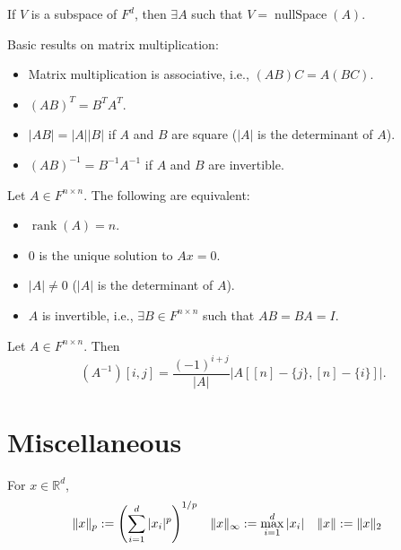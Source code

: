 \documentclass[a4paper,12pt,fleqn]{article}
\newenvironment*{tightemize}{\begin{itemize}[noitemsep]}{\end{itemize}}
\DeclareMathOperator{\rank}{rank}
\DeclareMathOperator{\nullSpace}{nullSpace}
\begin{document}
\begin{theorem}[DWAP]
If $V$ is a subspace of $F^d$, then $\exists A$ such that $V = \nullSpace(A)$.
\end{theorem}

\begin{theorem}[DWAP]
Basic results on matrix multiplication:
\begin{tightemize}
\item Matrix multiplication is associative, i.e., $(AB)C = A(BC)$.
\item $(AB)^T = B^TA^T$.
\item $|AB| = |A||B|$ if $A$ and $B$ are square ($|A|$ is the determinant of $A$).
\item $(AB)^{-1} = B^{-1}A^{-1}$ if $A$ and $B$ are invertible.
\end{tightemize}
\end{theorem}

\begin{theorem}
Let $A \in F^{n \times n}$. The following are equivalent:
\begin{tightemize}
\item $\rank(A) = n$.
\item 0 is the unique solution to $Ax = 0$.
\item $|A| \neq 0$ ($|A|$ is the determinant of $A$).
\item $A$ is invertible, i.e., $\exists B \in F^{n \times n}$ such that $AB = BA = I$.
\end{tightemize}
\end{theorem}

\begin{theorem}
Let $A \in F^{n \times n}$. Then
\[ (A^{-1})[i, j] = \frac{(-1)^{i+j}}{|A|}|A[[n]-\{j\}, [n]-\{i\}]|. \]
\end{theorem}

\section{Miscellaneous}

\begin{definition}[$p$-norms]
For $x \in \mathbb{R}^d$,
\begin{align*}
\|x\|_p &:= \left(\sum_{i=1}^d |x_i|^p\right)^{1/p}
& \|x\|_{\infty} &:= \max_{i=1}^d |x_i|
& \|x\| &:= \|x\|_2
\end{align*}
\end{definition}
\end{document}
